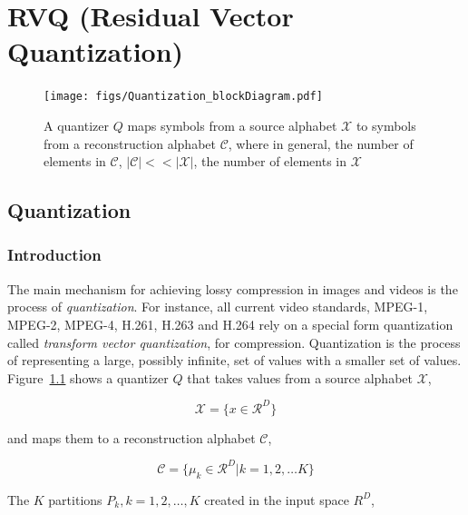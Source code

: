 \chapter{RVQ (Residual Vector Quantization)}
\label{chap_RVQ}	

\begin{figure}[htp]			
	\texttt{[image: figs/Quantization\_blockDiagram.pdf]}
	\caption{A quantizer $Q$ maps symbols from a source alphabet $\mathcal{X}$ to symbols from a reconstruction alphabet $\mathcal{C}$, where in general, the number of elements in $\mathcal{C}$, $|\mathcal{C}| << |\mathcal{X}|$, the number of elements in $\mathcal{X}$ }
	\label{fig:Quantization_block_diagram}
\end{figure}

\section{Quantization}
\subsection{Introduction}
\label{sec:quantization}

The main mechanism for achieving lossy compression in images and videos is the process of \emph{quantization}.  For instance, all current video standards, MPEG-1, MPEG-2, MPEG-4, H.261, H.263 and H.264 rely on a special form quantization called \emph{transform vector quantization}, for compression.  Quantization is the process of representing a large, possibly infinite, set of values with a smaller set of values.  Figure~\ref{fig:Quantization_block_diagram} shows a quantizer $Q$ that takes values from a source alphabet $\mathcal{X}$,

\begin{equation}
\mathcal{X}=\{x \in \mathcal{R}^D\}
\end{equation}

and maps them to a reconstruction alphabet $\mathcal{C}$, 

\begin{equation}
\mathcal{C}=\{\mu_k \in \mathcal{R}^D | k=1,2, \ldots K\}
\end{equation}

The $K$ partitions $P_k, k = 1, 2, \ldots, K$ created in the input space $R^D$, 

